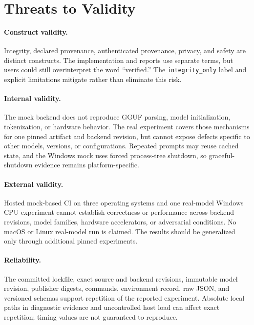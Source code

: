 \documentclass[11pt,a4paper]{article}
\begin{document}
\section{Threats to Validity}

\paragraph{Construct validity.} Integrity, declared provenance, authenticated provenance, privacy, and safety are distinct constructs. The implementation and reports use separate terms, but users could still overinterpret the word ``verified.'' The \texttt{integrity\_only} label and explicit limitations mitigate rather than eliminate this risk.

\paragraph{Internal validity.} The mock backend does not reproduce GGUF parsing, model initialization, tokenization, or hardware behavior. The real experiment covers those mechanisms for one pinned artifact and backend revision, but cannot expose defects specific to other models, versions, or configurations. Repeated prompts may reuse cached state, and the Windows mock uses forced process-tree shutdown, so graceful-shutdown evidence remains platform-specific.

\paragraph{External validity.} Hosted mock-based CI on three operating systems and one real-model Windows CPU experiment cannot establish correctness or performance across backend revisions, model families, hardware accelerators, or adversarial conditions. No macOS or Linux real-model run is claimed. The results should be generalized only through additional pinned experiments.

\paragraph{Reliability.} The committed lockfile, exact source and backend revisions, immutable model revision, publisher digests, commands, environment record, raw JSON, and versioned schemas support repetition of the reported experiment. Absolute local paths in diagnostic evidence and uncontrolled host load can affect exact repetition; timing values are not guaranteed to reproduce.
\end{document}
